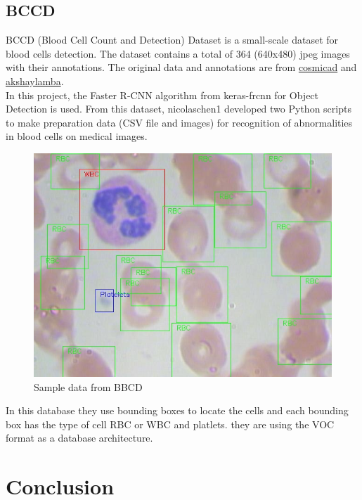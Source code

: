 \subsection{BCCD}
BCCD (Blood Cell Count and Detection) Dataset is a small-scale dataset for blood cells detection. The dataset contains a total of 364 (640x480) jpeg images with their annotations. The original data and annotations are from \href{https://github.com/cosmicad/dataset}{cosmicad}  and \href{https://github.com/akshaylamba/all_CELL_data}{akshaylamba}. \\
In this project, the Faster R-CNN algorithm from keras-frcnn for Object Detection is used. From this dataset, nicolaschen1 developed two Python scripts to make preparation data (CSV file and images) for recognition of abnormalities in blood cells on medical images.

\begin{figure}[H]
\centering
\includegraphics[width=\linewidth]{../images/BBCD1.jpg}
\caption{Sample data from BBCD}
\label{fig:BBCD1}
\end{figure}

In this database they use bounding boxes to locate the cells and each bounding box has the type of cell RBC or WBC and platlets. they are using the VOC format as a database architecture.

\newpage
\section{Conclusion}
\hspace*{0.16in}



\newpage

